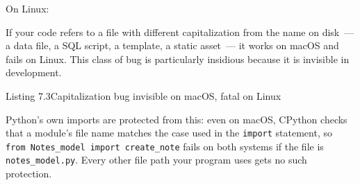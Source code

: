 \noindent{}On Linux:

\begin{codebox}[short]

\begin{Shaded}
\begin{Highlighting}[]
\NormalTok{(}\NormalTok{)  }
\NormalTok{(}\NormalTok{)  }
\end{Highlighting}
\end{Shaded}

\end{codebox}

\noindent{}If your code refers to a file with different capitalization from the name on disk~--- a data file, a SQL script, a template, a static asset~--- it works on macOS and fails on Linux. This class of bug is particularly insidious because it is invisible in development.

\begin{codeboxcap}[short]{\textcolor{accent}{Listing 7.3}\enspace Capitalization bug invisible on macOS, fatal on Linux}

\begin{Shaded}
\begin{Highlighting}[]

 \NormalTok{(}\NormalTok{) }
\OperatorTok{=}

\end{Highlighting}
\end{Shaded}

\end{codeboxcap}

\noindent{}Python's own imports are protected from this: even on macOS, CPython checks that a module's file name matches the case used in the \texttt{import} statement, so \texttt{from\ Notes\_}\allowbreak{}\texttt{model\ import\ create\_}\allowbreak{}\texttt{note} fails on both systems if the file is \texttt{notes\_model.py}. Every other file path your program uses gets no such protection.

